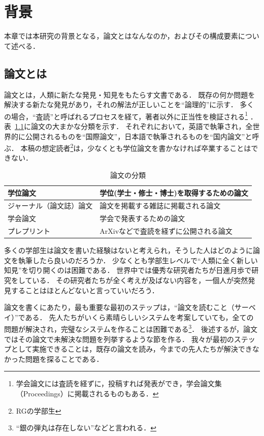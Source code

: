 \chapter{背景}
\label{background}

本章では本研究の背景となる，論文とはなんなのか，およびその構成要素について述べる．

\section{論文とは}
\label{background:whtthesis}
論文とは，人類に新たな発見・知見をもたらす文書である．
既存の何か問題を解決する新たな発見があり，それの解法が正しいことを``論理的''に示す．
多くの場合，``査読''と呼ばれるプロセスを経て，著者以外に正当性を検証される\footnote{学会論文には査読を経ずに，投稿すれば発表ができ，学会論文集（Proceedings）に掲載されるものもある．} ．
表~\ref{table:typepaper}に論文の大まかな分類を示す．
それぞれにおいて，英語で執筆され，全世界的に公開されるものを``国際論文''，日本語で執筆されるものを``国内論文''と呼ぶ．
本稿の想定読者\footnote{RGの学部生}は，少なくとも学位論文を書かなければ卒業することはできない．

\begin{table}[!hbtp]
    \begin{center}
        \caption{論文の分類}
				\label{table:typepaper}
  			\begin{tabular}{|l|l|}
					\hline
    			学位論文 & 学位(学士・修士・博士)を取得するための論文 \\
					\hline
    			ジャーナル（論文誌）論文 & 論文を掲載する雑誌に掲載される論文  \\
    			\hline
					学会論文 & 学会で発表するための論文 \\
    			\hline \hline
					プレプリント & ArXivなどで査読を経ずに公開される論文  \\
  				\hline
				\end{tabular}
		\end{center}
\end{table}

多くの学部生は論文を書いた経験はないと考えられ，そうした人はどのように論文を執筆したら良いのだろうか．
少なくとも学部生レベルで``人類に全く新しい知見''を切り開くのは困難である．
世界中では優秀な研究者たちが日進月歩で研究をしている．
その研究者たちが全く考えが及ばない内容を，一個人が突然発見することはほとんどないと言っていいだろう．

論文を書くにあたり，最も重要な最初のステップは，``論文を読むこと（サーベイ）''である．
先人たちがいくら素晴らしいシステムを考案していても，全ての問題が解決され，完璧なシステムを作ることは困難である\footnote{``銀の弾丸は存在しない''などと言われる．}．
後述するが，論文ではその論文で未解決な問題を列挙するような節を作る．
我々が最初のステップとして実施できることは，既存の論文を読み，今までの先人たちが解決できなかった問題を探ることである．

